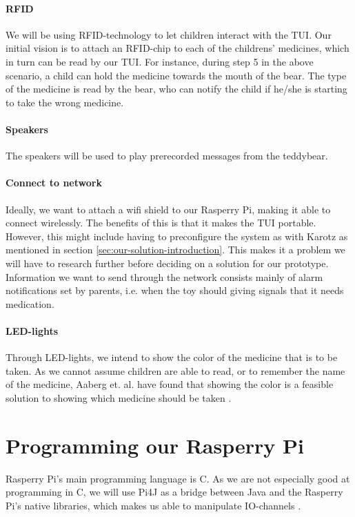 \paragraph{RFID}
We will be using RFID-technology to let children interact with the TUI. Our initial vision is to attach an RFID-chip to each of the childrens' medicines, which in turn can be read by our TUI. For instance, during step 5 in the above scenario, a child can hold the medicine towards the mouth of the bear. The type of the medicine is read by the bear, who can notify the child if he/she is starting to take the wrong medicine. 

\paragraph{Speakers}
The speakers will be used to play prerecorded messages from the teddybear.

\paragraph{Connect to network}
Ideally, we want to attach a wifi shield to our Rasperry Pi, making it able to connect wirelessly. The benefits of this is that it makes the TUI portable. However, this might include having to preconfigure the system as with Karotz as mentioned in section \ref{sec:our-solution-introduction}. This makes it a problem we will have to research further before deciding on a solution for our prototype. Information we want to send through the network consists mainly of alarm notifications set by parents, i.e. when the toy should giving signals that it needs medication. 

\paragraph{LED-lights}
Through LED-lights, we intend to show the color of the medicine that is to be taken. As we cannot assume children are able to read, or to remember the name of the medicine, Aaberg et. al. have found that showing the color is a feasible solution to showing which medicine should be taken \cite{CustomerDriven}. 

\section{Programming our Rasperry Pi}
Rasperry Pi's main programming language is C. As we are not especially good at programming in C, we will use Pi4J as a bridge between Java and the Rasperry Pi's native libraries, which makes us able to manipulate IO-channels \cite{pi4j}.
  

 